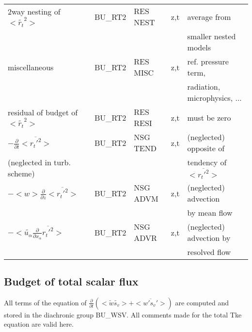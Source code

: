 \begin{center}
\begin{tabular}{||p{5cm}|>{\centering}p{2cm}|>{\centering}p{2.5cm}|>{\centering}p{0.5cm}|p{5.5cm }||}
\hline
{\rm 2way nesting of }$<\tilde{r_t}^2>$ & BU\_RT2 & RES NEST & z,t& average from\\
 & & & & smaller nested models \\
\hline
{\rm miscellaneous} & BU\_RT2 & RES MISC & z,t & ref. pressure term, \\
 & & && radiation, microphysics, ... \\
\hline
{\rm residual of budget of} $<\tilde{r_t}^2>$ & BU\_RT2 & RES RESI & z,t & must be zero \\
\hline
$-\frac{\partial }{\partial t}<\overline{r_t'^2}>$ & BU\_RT2 & NSG TEND & z,t & (neglected) opposite of\\
(neglected in turb. scheme) & & & &tendency of $<\overline{r_t'^2}>$ \\
\hline
$-<w>\frac{\partial}{\partial z}<\overline{r_t'^2}>$  & BU\_RT2 & NSG ADVM & z,t & (neglected) advection \\
 & & & & by mean flow\\
\hline
$-<\tilde{u_\alpha}\frac{\partial}{\partial x_\alpha}\overline{r_t'^2}>$  & BU\_RT2 & NSG ADVR & z,t & (neglected) advection by\\
 & & & &resolved flow\\
\hline
\hline
\end{tabular}
\end{center}

\newpage

\subsection{Budget of total scalar flux}


All terms of the equation of $\frac{\partial}{\partial t} (<\tilde{w}\tilde{s_v}> + <\overline{w's_v'}>)$ are
computed and stored in the diachronic group BU\_WSV. 
All comments made for the total Tke equation are valid here.\\

